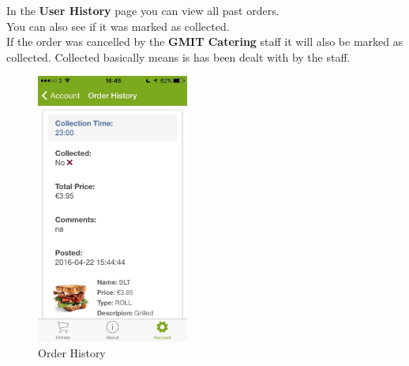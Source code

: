 \begin{minipage}{0.55\textwidth}
In the \textbf{User History} page you can view all past orders.
\\

You can also see if it was marked as collected.
\\

If the order was cancelled by the \textbf{GMIT Catering} staff it will also be marked as collected.
Collected basically means is has been dealt with by the staff.
\\

\end{minipage}
\begin{minipage}{5cm}
	\begin{figure}[H]
		\includegraphics[width=5cm]{img/mobile-app/screen-shots/IMG_2916.jpg}
		\caption{Order History}
	\end{figure}
\end{minipage} \hfill

